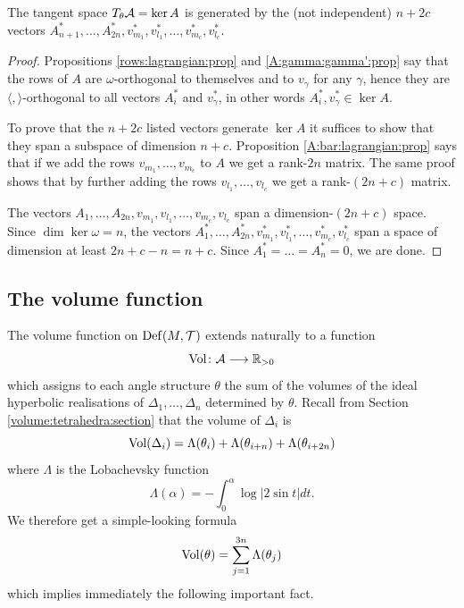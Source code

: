 \begin{prop} \label{redundant:generators:prop}
The tangent space $T_\theta \mathcal{A} = \ker A$ is generated by the (not independent) $n+2c$ vectors
$A_{n+1}^*,\ldots, A_{2n}^*, v_{m_1}^*, v_{l_1}^*, \ldots, v_{m_c}^*, v_{l_c}^*$.
\end{prop}
\begin{proof}
Propositions \ref{rows:lagrangian:prop} and \ref{A:gamma:gamma':prop} say that the rows of $A$ are $\omega$-orthogonal to themselves and to $v_\gamma$ for any $\gamma$, hence they are $\langle, \rangle$-orthogonal to all vectors $A_i^*$ and $v_\gamma^*$, in other words $A_i^*, v_\gamma^* \in \ker A$.

To prove that the $n+2c$ listed vectors generate $\ker A$ it suffices to show that they span a subspace of dimension $n+c$. Proposition \ref{A:bar:lagrangian:prop} says that if we add the rows $v_{m_1}, \ldots, v_{m_c}$ to $A$ we get a rank-$2n$ matrix. The same proof shows that by further adding the rows $v_{l_1},\ldots, v_{l_c}$ we get a rank-$(2n+c)$ matrix. 

The vectors $A_1,\ldots, A_{2n},v_{m_1}, v_{l_1}, \ldots, v_{m_c}, v_{l_c}$  span a dimension-$(2n+c)$ space. Since $\dim \ker \omega = n$, the vectors $A_1^*,\ldots, A_{2n}^*,v_{m_1}^*, v_{l_1}^*, \ldots, v_{m_c}^*, v_{l_c}^*$ span a space of dimension at least $2n+c-n = n+c$. Since $A_1^* = \ldots = A_n^* = 0$, we are done.
\end{proof}

\subsection{The volume function}
The volume function on ${\rm Def}(M,\mathcal{T})$ extends naturally to a function
$${\rm Vol}\colon \mathcal{A} \longrightarrow \mathbb{R}_{>0}$$
which assigns to each angle structure $\theta$ the sum of the volumes of the ideal hyperbolic realisations of $\Delta_1,\ldots, \Delta_n$ determined by $\theta$. 
Recall from Section \ref{volume:tetrahedra:section} that the volume of $\Delta_i$ is
$${\rm Vol}(\Delta_i) = \Lambda(\theta_i) + \Lambda(\theta_{i+n}) + \Lambda(\theta_{i+2n})$$
where $\Lambda$ is the Lobachevsky function
$$\Lambda(\alpha) = -\int_0^\alpha \log |2\sin t| dt.$$
We therefore get a simple-looking formula
$${\rm Vol}(\theta) = \sum_{j=1}^{3n} \Lambda(\theta_j)$$
which implies immediately the following important fact.

